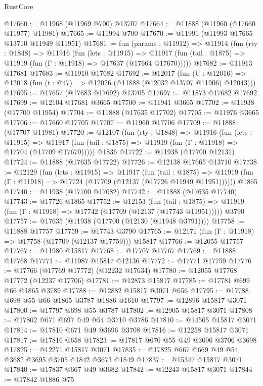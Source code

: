 \begin{lexlean}{RustCore}
\begin{coremodule}
@17660 := @11968 (@11969 @700) @13707
@17664 := @11888 (@11960 (@17660 @11977) @11981)
@17665 := @11994 @700
@17670 := @11991 (@11993 @17665 @13710 @11949 @11951)
@17681 := fun (params : @11912) =>
  @11914
    (fun (rty : @1848) =>
    @11916
      (fun (lets : @11915) =>
      @11917 (fun (tail : @1875) => @11919 (fun (Γ : @11918) => @17637 (@17664 @17670)))))
@17682 := @11913 @17681
@17683 := @11910 @17682
@17692 := @12017
    (fun (U : @12016) => @12018 (fun (t : @47) => @12026 (@11888 (@12032 @13707 @11906) @12043)))
@17695 := @17657 (@17683 @17692) @13705
@17697 := @11873 @17682 @17692
@17699 := @12104 @17681 @3665
@17700 := @11941 @3665
@17702 := @11938 (@17700 @11954)
@17704 := @11888 (@17635 @17702)
@17705 := @11976 @3665
@17706 := @17660 @17705
@17707 := @11960 @17706
@17709 := @11888 (@17707 @11981)
@17720 := @12107
    (fun (rty : @1848) =>
    @11916
      (fun (lets : @11915) =>
      @11917 (fun (tail : @1875) => @11919 (fun (Γ : @11918) => @17704 (@17709 @17670)))))
    @1836
@17722 := @11938 (@17700 @12131)
@17724 := @11888 (@17635 @17722)
@17726 := @12138 @17665 @13710
@17738 := @12129
    (fun (lets : @11915) =>
    @11917
      (fun (tail : @1875) =>
      @11919 (fun (Γ : @11918) => @17724 (@17709 (@12137 (@17726 @11949 @11951))))))
    @1865
@17740 := @11938 (@17700 @17082)
@17742 := @11888 (@17635 @17740)
@17743 := @17726 @1865
@17752 := @12153
    (fun (tail : @1875) => @11919 (fun (Γ : @11918) => @17742 (@17709 (@12137 (@17743 @11951)))))
    @3790
@17757 := @17635 (@11938 (@17700 (@12130 (@11948 @3791))))
@17758 := @11888 @17757
@17759 := @17743 @3790
@17765 := @12171 (fun (Γ : @11918) => @17758 (@17709 (@12137 @17759))) @15817
@17766 := @12055 @17757
@17767 := @11980 @15817
@17768 := @17707 @17767
@17769 := @11888 @17768
@17771 := @11987 @15817 @12136
@17772 := @17771 @17759
@17776 := @17766 (@17769 @17772) (@12232 @17634)
@17780 := @12055 @17768 @17772 (@12237 @17706)
@17781 := @12873 @15817
@17785 := @17781 @699 @66 @1865 @3789
@17788 := @12882 @15817 @3071 @656
@17795 := @17788 @698 @55 @66 @1865 @3787 @1886 @1610
@17797 := @12896 @15817 @3071
@17800 := @17797 @698 @55 @3787
@17802 := @12905 @15817 @3071
@17808 := @17802 @671 @697 @49 @54 @3710 @3786
@17810 := @14565 @15817 @3071
@17814 := @17810 @671 @49 @3696 @3708
@17816 := @12258 @15817 @3071
@17817 := @17816 @658
@17823 := @17817 @670 @55 @49 @3696 @3706 @3698
@17825 := @12271 @15817 @3071
@17835 := @17825 @667 @669 @49 @54 @3682 @3695 @3705 @1842 @3673 @1849
@17837 := @15347 @15817 @3071
@17840 := @17837 @667 @49 @3682
@17842 := @12243 @15817 @3071
@17844 := @17842 @1886 @75

\end{coremodule}
\end{lexlean}
